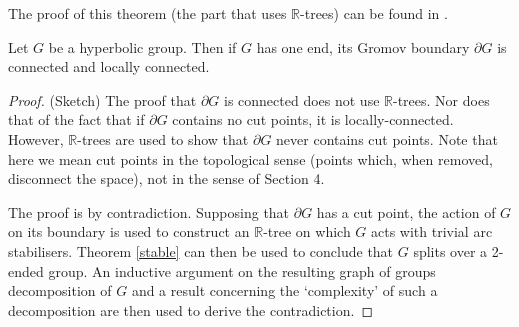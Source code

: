 The proof of this theorem (the part that uses $\mathbb{R}$-trees) can be found in \cite{Swarup}.
\begin{theorem}
    Let $G$ be a hyperbolic group. Then if $G$ has one end, its Gromov boundary $\partial G$ is connected and locally connected.
\end{theorem}

\begin{proof}
    (Sketch) The proof that $\partial G$ is connected does not use $\mathbb{R}$-trees. Nor does that of the fact that if $\partial G$ contains no cut points, it is locally-connected. However, $\mathbb{R}$-trees are used to show that $\partial G$ never contains cut points. Note that here we mean cut points in the topological sense (points which, when removed, disconnect the space), not in the sense of Section 4.
    
    The proof is by contradiction. Supposing that $\partial G$ has a cut point, the action of $G$ on its boundary is used to construct an $\mathbb{R}$-tree on which $G$ acts with trivial arc stabilisers. Theorem \ref{stable} can then be used to conclude that $G$ splits over a 2-ended group. An inductive argument on the resulting graph of groups decomposition of $G$ and a result concerning the `complexity' of such a decomposition are then used to derive the contradiction.
\end{proof}









